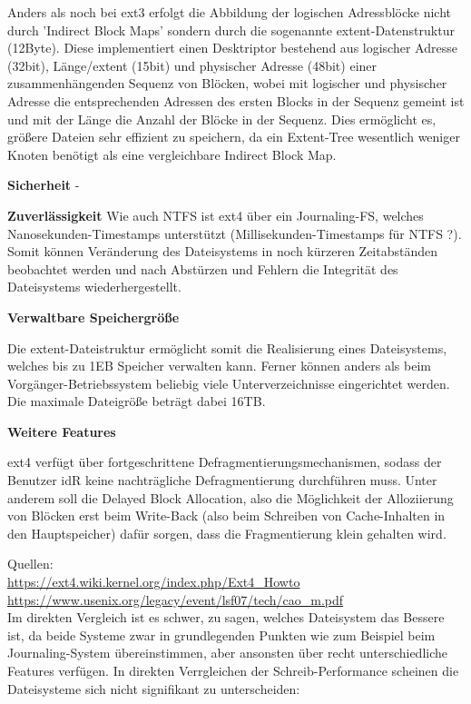 \documentclass[numbers=noendperiod]{scrartcl}
\begin{document}
Anders als noch bei ext3 erfolgt die Abbildung der logischen Adressblöcke nicht durch 'Indirect Block Maps' sondern durch die sogenannte extent-Datenstruktur (12Byte). Diese implementiert einen Desktriptor bestehend aus logischer Adresse (32bit), Länge/extent (15bit) und physischer Adresse (48bit) einer zusammenhängenden Sequenz von Blöcken, wobei mit logischer und physischer Adresse die entsprechenden Adressen des ersten Blocks in der Sequenz gemeint ist und mit der Länge die Anzahl der Blöcke in der Sequenz. Dies ermöglicht es, größere Dateien sehr effizient zu speichern, da ein Extent-Tree wesentlich weniger Knoten benötigt als eine vergleichbare Indirect Block Map.

\textbf{Sicherheit} -

\textbf{Zuverlässigkeit}
Wie auch NTFS ist ext4 über ein Journaling-FS, welches Nanosekunden-Timestamps unterstützt (Millisekunden-Timestamps für NTFS ?). Somit können Veränderung des Dateisystems in noch kürzeren Zeitabständen beobachtet werden und nach Abstürzen und Fehlern die Integrität des Dateisystems wiederhergestellt.

\textbf{Verwaltbare Speichergröße}

Die extent-Dateistruktur ermöglicht somit die Realisierung eines Dateisystems, welches bis zu 1EB Speicher verwalten kann. Ferner können anders als beim Vorgänger-Betriebssystem beliebig viele Unterverzeichnisse eingerichtet werden. Die maximale Dateigröße beträgt dabei 16TB.

\textbf{Weitere Features}

ext4 verfügt über fortgeschrittene Defragmentierungsmechanismen, sodass der Benutzer idR keine nachträgliche Defragmentierung durchführen muss. Unter anderem soll die Delayed Block Allocation, also die Möglichkeit der Alloziierung von Blöcken erst beim Write-Back (also beim Schreiben von Cache-Inhalten in den Hauptspeicher) dafür sorgen, dass die Fragmentierung klein gehalten wird.

Quellen:\\
\url{https://ext4.wiki.kernel.org/index.php/Ext4\_Howto}\\
\url{https://www.usenix.org/legacy/event/lsf07/tech/cao\_m.pdf}\\

Im direkten Vergleich ist es schwer, zu sagen, welches Dateisystem das Bessere ist, da beide Systeme zwar in grundlegenden Punkten wie zum Beispiel beim Journaling-System übereinstimmen, aber ansonsten über recht unterschiedliche Features verfügen. In direkten Verrgleichen der Schreib-Performance scheinen die Dateisysteme sich nicht signifikant zu unterscheiden:
\end{document}

